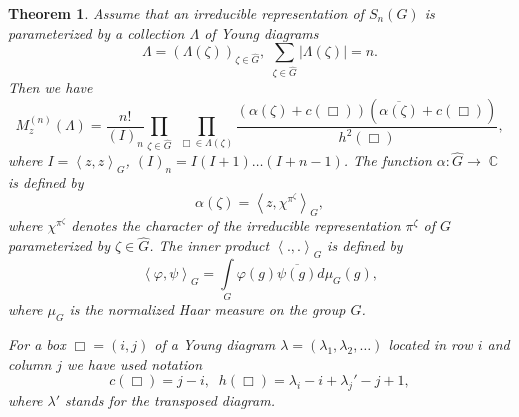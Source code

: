 \documentclass[12pt]{amsart}
\newtheorem{thm}{Theorem}[section]
\theoremstyle{definition}
\numberwithin{equation}{section}
\DeclareMathOperator{\C}{\mathbb{C}}
\begin{document}
\begin{thm}\label{Theorem13.2.2}
Assume that an irreducible representation of $S_n(G)$ is parameterized by a
collection $\Lambda$ of Young diagrams
\begin{equation}\label{13.2.2.1}
\Lambda=\left(\Lambda(\zeta)\right)_{\zeta\in\widehat{G}},\;
\sum\limits_{\zeta\in\widehat{G}}|\Lambda(\zeta)|=n.
\end{equation}
Then we have
\begin{equation}\label{13.2.2.2}
M_z^{(n)}\left(\Lambda\right)=\frac{n!}{\left(I\right)_n}
\prod\limits_{\zeta\in\widehat{G}}\;\prod\limits_{\Box\in\Lambda(\zeta)}
\frac{\left(\alpha(\zeta)+c(\Box)\right)\left(\overline{\alpha(\zeta)}+c(\Box)\right)}{h^2(\Box)},
\end{equation}
where $I=\left<z,z\right>_G$, $(I)_n=I(I+1)\ldots (I+n-1)$.
The function $\alpha : \widehat{G}\longrightarrow\C$ is defined by
\begin{equation}\label{13.2.2.3}
\alpha(\zeta)=\left<z,\chi^{\pi^\zeta}\right>_G,
\end{equation}
where $\chi^{\pi^{\zeta}}$ denotes the character of the irreducible representation $\pi^{\zeta}$ of $G$ parameterized by $\zeta\in\widehat{G}$. The inner product  $\left<.,.\right>_G$ is defined by
\begin{equation}
\left<\varphi,\psi\right>_G=\int\limits_G\varphi(g)\overline{\psi(g)}d\mu_G(g),
\end{equation}
where $\mu_G$ is the normalized Haar measure on the group $G$.

For a box $\Box=(i,j)$ of a Young diagram $\lambda=(\lambda_1,\lambda_2,\ldots)$
located in row $i$ and column $j$ we have used notation
$$
c(\Box)=j-i,\;\; h(\Box)=\lambda_i-i+\lambda_j'-j+1,
$$
where $\lambda'$ stands for the transposed diagram.
\end{thm}
\end{document}
